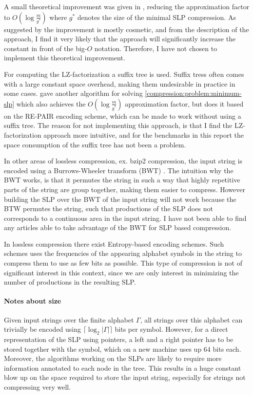 \documentclass[twoside,11pt,openright]{report}
\newcommand{\ceil}[1] {\lceil #1 \rceil}
\begin{document}
A small theoretical improvement was given in \cite{Rytter2003211}, reducing the approximation factor to $O(\log{\frac{m}{g^*}})$ where $g^*$ denotes the size of the minimal SLP compression. As suggested by \cite{Rytter2003211} the improvement is mostly cosmetic, and from the description of the approach, I find it very likely that the approach will significantly increase the constant in front of the big-$O$ notation. Therefore, I have not chosen to implement this theoretical improvement.

For computing the LZ-factorization a suffix tree is used. Suffix tress often comes with a large constant space overhead, making them undesirable in practice in some cases. \cite{Sakamoto2005416} gave another algorithm for solving \cref{compression:problem:minimum-slp} which also achieves the $O(\log{\frac{m}{g^*}})$ approximation factor, but does it based on the RE-PAIR encoding scheme, which can be made to work without using a suffix tree. The reason for not implementing this approach, is that I find the LZ-factorization approach more intuitive, and for the benchmarks in this report the space consumption of the suffix tree has not been a problem.

In other areas of lossless compression, ex. bzip2 compression, the input string is encoded using a Burrows-Wheeler transform (BWT) \cite{BurrowsWheeler}. The intuition why the BWT works, is that it permutes the string in such a way that highly repetitive parts of the string are group together, making them easier to compress. However building the SLP over the BWT of the input string will not work because the BTW permutes the string, such that productions of the SLP does not corresponds to a continuous area in the input string. I have not been able to find any articles able to take advantage of the BWT for SLP based compression.

In lossless compression there exist Entropy-based encoding schemes. Such schemes uses the frequencies of the appearing alphabet symbols in the string to compress them to use as few bits as possible. This type of compression is not of significant interest in this context, since we are only interest in minimizing the number of productions in the resulting SLP.

\paragraph{Notes about size}
Given input strings over the finite alphabet $\Gamma$, all strings over this alphabet can trivially be encoded using $\ceil{\log_2 |\Gamma|}$ bits per symbol. However, for a direct representation of the SLP using pointers, a left and a right pointer has to be stored together with the symbol, which on a new machine uses up $64$ bits each. Moreover, the algorithms working on the SLPs are likely to require more information annotated to each node in the tree. This results in a huge constant blow up on the space required to store the input string, especially for strings not compressing very well.
\end{document}
